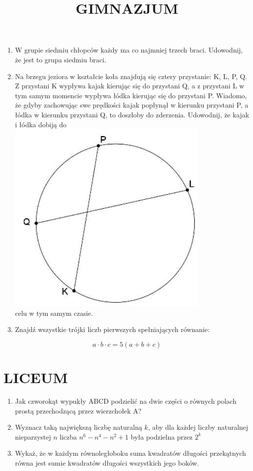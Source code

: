 \documentclass[10pt]{article}
\title{GIMNAZJUM }
\author{}
\date{}
\begin{document}
\maketitle
\begin{enumerate}
  \item W grupie siedmiu chłopców każdy ma co najmniej trzech braci. Udowodnij, że jest to grupa siedmiu braci.
  \item Na brzegu jeziora w kształcie koła znajdują się cztery przystanie: K, L, P, Q. Z przystani K wypływa kajak kierując się do przystani Q, a z przystani L w tym samym momencie wypływa łódka kierując się do przystani P. Wiadomo, że gdyby zachowując swe prędkości kajak popłynął w kierunku przystani P, a łódka w kierunku przystani Q, to doszłoby do zderzenia. Udowodnij, że kajak i łódka dobiją do\\
\includegraphics[max width=\textwidth, center]{2024_11_21_4102729fe0ded42594c6g-1}\\
celu w tym samym czasie.
  \item Znajdź wszystkie trójki liczb pierwszych spełniających równanie:
\end{enumerate}

\[
a \cdot b \cdot c=5(a+b+c)
\]

\section*{LICEUM}
\begin{enumerate}
  \item Jak czworokąt wypukły ABCD podzielić na dwie części o równych polach prostą przechodzącą przez wierzchołek A?
  \item Wyznacz taką największą liczbę naturalną \(k\), aby dla każdej liczby naturalnej nieparzystej \(n\) liczba \(n^{6}-n^{4}-n^{2}+1\) była podzielna przez \(2^{k}\)
  \item Wykaż, że w każdym równoległoboku suma kwadratów długości przekątnych równa jest sumie kwadratów długości wszystkich jego boków.
\end{enumerate}
\end{document}

